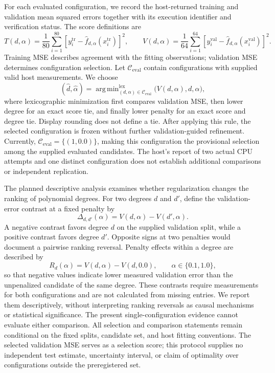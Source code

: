\documentclass[11pt]{article}
\begin{document}
For each evaluated configuration, we record the host-returned training and validation mean squared errors together with its execution identifier and verification status. The score definitions are
\[
T(d,\alpha)=\frac{1}{80}\sum_{i=1}^{80}
\left[y_i^{\mathrm{tr}}-\widehat f_{d,\alpha}(x_i^{\mathrm{tr}})\right]^2,
\qquad
V(d,\alpha)=\frac{1}{64}\sum_{i=1}^{64}
\left[y_i^{\mathrm{val}}-\widehat f_{d,\alpha}(x_i^{\mathrm{val}})\right]^2.
\]
Training MSE describes agreement with the fitting observations; validation MSE determines configuration selection. Let \(\mathcal{C}_{\mathrm{eval}}\) contain configurations with supplied valid host measurements. We choose
\[
(\widehat d,\widehat\alpha)
=
\mathop{\mathrm{arg\,min}}_{(d,\alpha)\in\mathcal{C}_{\mathrm{eval}}}^{\mathrm{lex}}
\bigl(V(d,\alpha),d,\alpha\bigr),
\]
where lexicographic minimization first compares validation MSE, then lower degree for an exact score tie, and finally lower penalty for an exact score and degree tie. Display rounding does not define a tie. After applying this rule, the selected configuration is frozen without further validation-guided refinement. Currently, \(\mathcal{C}_{\mathrm{eval}}=\{(1,0.0)\}\), making this configuration the provisional selection among the supplied evaluated candidates. The host's report of two actual CPU attempts and one distinct configuration does not establish additional comparisons or independent replication.

The planned descriptive analysis examines whether regularization changes the ranking of polynomial degrees. For two degrees \(d\) and \(d'\), define the validation-error contrast at a fixed penalty by
\[
\Delta_{d,d'}(\alpha)=V(d,\alpha)-V(d',\alpha).
\]
A negative contrast favors degree \(d\) on the supplied validation split, while a positive contrast favors degree \(d'\). Opposite signs at two penalties would document a pairwise ranking reversal. Penalty effects within a degree are described by
\[
R_d(\alpha)=V(d,\alpha)-V(d,0.0),
\qquad \alpha\in\{0.1,1.0\},
\]
so that negative values indicate lower measured validation error than the unpenalized candidate of the same degree. These contrasts require measurements for both configurations and are not calculated from missing entries. We report them descriptively, without interpreting ranking reversals as causal mechanisms or statistical significance. The present single-configuration evidence cannot evaluate either comparison. All selection and comparison statements remain conditional on the fixed splits, candidate set, and host fitting conventions. The selected validation MSE serves as a selection score; this protocol supplies no independent test estimate, uncertainty interval, or claim of optimality over configurations outside the preregistered set.
\end{document}
